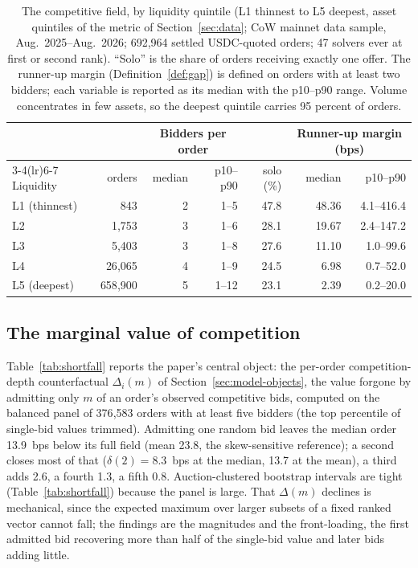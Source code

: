 \documentclass[11pt]{article}
\theoremstyle{plain}
\theoremstyle{definition}
\theoremstyle{remark}
\begin{document}
\begin{table}[t]
\centering
{\fontsize{10}{12}\selectfont
\begin{tabular}{lrrrrrr}
\toprule
 & & \multicolumn{2}{c}{Bidders per order} & & \multicolumn{2}{c}{Runner-up margin (bps)} \\
\cmidrule(lr){3-4}\cmidrule(lr){6-7}
Liquidity & orders & median & p10--p90 & solo (\%) & median & p10--p90 \\
\midrule
L1 (thinnest) & 843     & 2 & 1--5  & 47.8 & 48.36 & 4.1--416.4 \\
L2            & 1{,}753  & 3 & 1--6  & 28.1 & 19.67 & 2.4--147.2 \\
L3            & 5{,}403  & 3 & 1--8  & 27.6 & 11.10 & 1.0--99.6 \\
L4            & 26{,}065 & 4 & 1--9  & 24.5 & 6.98  & 0.7--52.0 \\
L5 (deepest)  & 658{,}900 & 5 & 1--12 & 23.1 & 2.39  & 0.2--20.0 \\
\bottomrule
\end{tabular}}
\caption{The competitive field, by liquidity quintile (L1 thinnest to L5 deepest, asset quintiles of the metric of Section~\ref{sec:data}; CoW mainnet data sample, Aug.~2025--Aug.~2026; 692{,}964 settled USDC-quoted orders; 47 solvers ever at first or second rank). ``Solo'' is the share of orders receiving exactly one offer. The runner-up margin (Definition~\ref{def:gap}) is defined on orders with at least two bidders; each variable is reported as its median with the p10--p90 range. Volume concentrates in few assets, so the deepest quintile carries 95 percent of orders.}
\label{tab:field}
\end{table}

\subsection{The marginal value of competition}\label{sec:curve}
Table~\ref{tab:shortfall} reports the paper's central object: the per-order competition-depth counterfactual $\Delta_i(m)$ of Section~\ref{sec:model-objects}, the value forgone by admitting only $m$ of an order's observed competitive bids, computed on the balanced panel of 376{,}583 orders with at least five bidders (the top percentile of single-bid values trimmed). Admitting one random bid leaves the median order 13.9~bps below its full field (mean 23.8, the skew-sensitive reference); a second closes most of that ($\delta(2)=8.3$~bps at the median, 13.7 at the mean), a third adds 2.6, a fourth 1.3, a fifth 0.8. Auction-clustered bootstrap intervals are tight (Table~\ref{tab:shortfall}) because the panel is large. That $\Delta(m)$ declines is mechanical, since the expected maximum over larger subsets of a fixed ranked vector cannot fall; the findings are the magnitudes and the front-loading, the first admitted bid recovering more than half of the single-bid value and later bids adding little.
\end{document}
